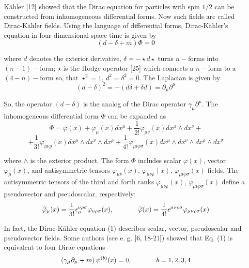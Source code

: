 \documentclass[a4paper,12pt]{article}
\begin{document}
K\"ahler [12] showed that the Dirac equation for particles with spin $1/2$
can be constructed from inhomogeneous differential forms. Now such fields
are called Dirac-K\"ahler fields. Using the language of differential forms,
Dirac-K\"ahler's equation in four dimensional space-time is given by
\begin{equation}
\left( d-\delta +m\right) \Phi =0  \label{1}
\end{equation}

where $d$ denotes the exterior derivative, $\delta =-\star d\star
$ turns $ n- $forms into $(n-1)-$form; $\star $ is the Hodge
operator [25] which connects a $n-$form to a $(4-n)-$form so, that
$\star ^2=1$, $d^2=\delta ^2=0 $. The Laplacian is given by
\[
\left( d-\delta \right) ^2=-\left( d\delta +\delta d\right)
=\partial _\mu \partial ^\mu
\]

So, the operator $\left( d-\delta \right) $ is the analog of the
Dirac operator $\gamma _\mu \partial ^\mu $. The inhomogeneous
differential form $ \Phi $ can be expanded as
\[
\Phi =\varphi (x)+\varphi _\mu (x)dx^\mu +\frac 1{2!}\varphi _{\mu \nu
}(x)dx^\mu \wedge dx^\nu +
\]
\begin{equation}
+\frac 1{3!}\varphi _{\mu \nu \rho }(x)dx^\mu \wedge dx^\nu \wedge dx^\rho
+\frac 1{4!}\varphi _{\mu \nu \rho \sigma }(x)dx^\mu \wedge dx^\nu \wedge
dx^\rho \wedge dx^\sigma  \label{2}
\end{equation}

where $\wedge $ is the exterior product. The form $\Phi $ includes
scalar $ \varphi (x)$, vector $\varphi _\mu (x)$, and
antisymmetric tensors $\varphi _{\mu \nu }(x)$, $\varphi _{\mu \nu
\rho }(x)$, $\varphi _{\mu \nu \rho \sigma }(x)$ fields. The
antisymmetric tensors of the third and forth ranks $ \varphi _{\mu
\nu \rho }(x)$, $\varphi _{\mu \nu \rho \sigma }(x)$ define a
pseudovector and pseudoscalar, respectively:
\begin{equation}
\widetilde{\varphi }_\mu (x)=\frac 1{3!}\epsilon _\mu ^{\nu \rho \sigma
}\varphi _{\nu \rho \sigma }(x),\hspace{0.5in}\widetilde{\varphi }(x)=\frac
1{4!}\epsilon ^{\mu \nu \rho \sigma }\varphi _{\mu \nu \rho \sigma }(x)
\label{3}
\end{equation}

In fact, the Dirac-K\"ahler equation (1) describes scalar, vector,
pseudoscalar and pseudovector fields. Some authors (see e. g. [6, 18-21])
showed that Eq. (1) is equivalent to four Dirac equations
\begin{equation}
\left( \gamma _\mu \partial _\mu +m\right) \psi
^{(b)}(x)=0,\hspace{0.5in} b=1,2,3,4 \label{4}
\end{equation}
\end{document}
